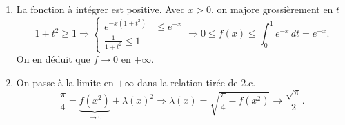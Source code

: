 \begin{enumerate}
\begin{enumerate}
 \item La fonction à intégrer est positive. Avec $x >0$, on majore grossièrement en $t$
\[
 1+t^2 \geq 1 \Rightarrow
 \left\lbrace 
 \begin{aligned}
  e^{-x(1+t^2)} &\leq e^{-x} \\ \frac{1}{1+t^2} \leq 1
 \end{aligned}
\right. \Rightarrow
0 \leq f(x) \leq \int_0^1 e^{-x}\, dt = e^{-x}. 
\]
On en déduit que $f\rightarrow 0$ en $+\infty$.

 \item On passe à la limite en $+\infty$ dans la relation tirée de 2.c.
\[
 \frac{\pi}{4} = \underset{ \rightarrow 0}{\underbrace{f(x^2)}} + \lambda(x)^2 \Rightarrow \lambda(x) = \sqrt{\frac{\pi}{4} - f(x^2)} \rightarrow \frac{\sqrt{\pi}}{2}.
\]

\end{enumerate}

\end{enumerate}
